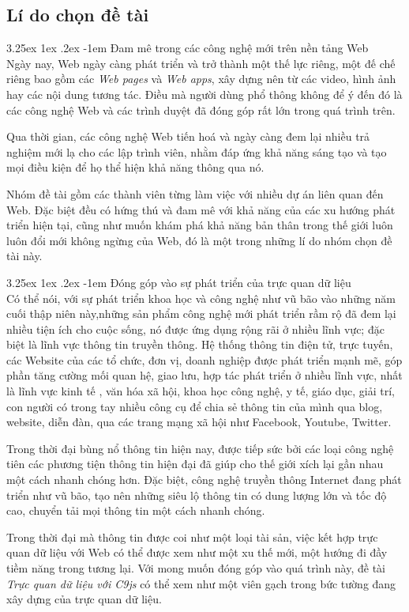 \documentclass[12pt,a4paper,twoside]{article}
\makeatletter
\newcommand{\myparagraph}[1]{\paragraph{#1}\mbox{}\\} %
\renewcommand\paragraph{\@startsection{paragraph}{5}{\z@}%
  {3.25ex \@plus1ex \@minus.2ex}%
  {-1em}%
  {\normalfont\normalsize\bfseries}}
\makeatother
\begin{document}
\subsection{Lí do chọn đề tài}
\myparagraph{Đam mê trong các công nghệ mới trên nền tảng Web}
Ngày nay, \cite{web_evolution} Web ngày càng phát triển và trở thành một thế lực riêng, một đế chế riêng bao gồm các \textit{Web pages} và \textit{Web apps}, xây dựng nên từ các video, hình ảnh hay các nội dung tương tác. Điều mà người dùng phổ thông không để ý đến đó là các công nghệ Web và các trình duyệt đã đóng góp rất lớn trong quá trình trên.

Qua thời gian, các công nghệ Web tiến hoá và ngày càng đem lại nhiều trả nghiệm mới lạ cho các lập trình viên, nhằm đáp ứng khả năng sáng tạo và tạo mọi điều kiện để họ thể hiện khả năng thông qua nó. 

Nhóm đề tài gồm các thành viên từng làm việc với nhiều dự án liên quan đến Web. Đặc biệt đều có hứng thú và đam mê với khả năng của các xu hướng phát triển hiện tại, cũng như muốn khám phá khả năng bản thân trong thế giới luôn luôn đổi mới không ngừng của Web, đó là một trong những lí do nhóm chọn đề tài này.

\myparagraph{Đóng góp vào sự phát triển của trực quan dữ liệu}
\cite{technology_boom} Có thể nói, với sự phát triển khoa học và công nghệ như vũ bão vào những năm cuối thập niên này,những sản phẩm công nghệ  mới phát triển rầm rộ đã đem lại nhiều tiện ích cho cuộc sống, nó được ứng dụng rộng rãi ở nhiều lĩnh vực; đặc biệt là lĩnh vực thông tin truyền thông. Hệ thống thông tin điện tử, trực tuyến, các Website của các tổ chức, đơn vị, doanh nghiệp được phát triển mạnh mẽ, góp phần tăng cường mối quan hệ, giao lưu, hợp tác phát triển ở nhiều lĩnh vực, nhất là lĩnh vực kinh tế , văn hóa xã hội, khoa học công nghệ, y tế, giáo dục, giải trí, con người có trong tay nhiều công cụ để chia sẻ thông tin của mình qua blog, website, diễn đàn, qua  các trang mạng xã hội như Facebook, Youtube, Twitter.

Trong thời đại bùng nổ thông tin hiện nay, được tiếp sức bởi các loại công nghệ tiên các phương tiện thông tin hiện đại đã giúp cho thế giới xích lại gần nhau một cách nhanh chóng hơn. Đặc biệt, công nghệ truyền thông Internet đang phát triển như vũ bão, tạo nên những siêu lộ thông tin có dung lượng lớn và tốc độ cao, chuyển tải mọi thông tin một cách nhanh chóng.

Trong thời đại mà thông tin được coi như một loại tài sản, việc kết hợp trực quan dữ liệu với Web có thể được xem như một xu thế mới, một hướng đi đầy tiềm năng trong tương lại. Với mong muốn đóng góp vào quá trình này, đề tài \textit{Trực quan dữ liệu với C9js} có thể xem như một viên gạch trong bức tường đang xây dựng của trực quan dữ liệu.
\end{document}

